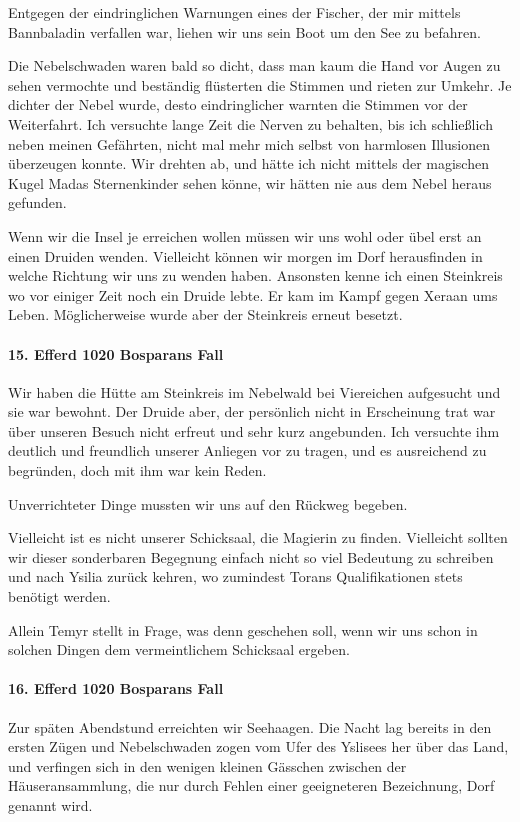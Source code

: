 Entgegen der eindringlichen Warnungen eines der Fischer, der mir mittels Bannbaladin verfallen war, liehen wir uns sein Boot um den See zu befahren.

Die Nebelschwaden waren bald so dicht, dass man kaum die Hand vor Augen zu sehen vermochte und beständig flüsterten die Stimmen und rieten zur Umkehr. Je dichter der Nebel wurde, desto eindringlicher warnten die Stimmen vor der Weiterfahrt. Ich versuchte lange Zeit die Nerven zu behalten, bis ich schließlich neben meinen Gefährten, nicht mal mehr mich selbst von harmlosen Illusionen überzeugen konnte. Wir drehten ab, und hätte ich nicht mittels der magischen Kugel Madas Sternenkinder sehen könne, wir hätten nie aus dem Nebel heraus gefunden.

Wenn wir die Insel je erreichen wollen müssen wir uns wohl oder übel erst an einen Druiden wenden. Vielleicht können wir morgen im Dorf herausfinden in welche Richtung wir uns zu wenden haben. Ansonsten kenne ich einen Steinkreis wo vor einiger Zeit noch ein Druide lebte. Er kam im Kampf gegen Xeraan ums Leben. Möglicherweise wurde aber der Steinkreis erneut besetzt.

\paragraph{15. Efferd 1020 Bosparans Fall}
Wir haben die Hütte am Steinkreis im Nebelwald bei Viereichen aufgesucht und sie war bewohnt. Der Druide aber, der persönlich nicht in Erscheinung trat war über unseren Besuch nicht erfreut und sehr kurz angebunden. Ich versuchte ihm deutlich und freundlich unserer Anliegen vor zu tragen, und es ausreichend zu begründen, doch mit ihm war kein Reden.

Unverrichteter Dinge mussten wir uns auf den Rückweg begeben.

Vielleicht ist es nicht unserer Schicksaal, die Magierin zu finden. Vielleicht sollten wir dieser sonderbaren Begegnung einfach nicht so viel Bedeutung zu schreiben und nach Ysilia zurück kehren, wo zumindest Torans Qualifikationen stets benötigt werden.

Allein Temyr stellt in Frage, was denn geschehen soll, wenn wir uns schon in solchen Dingen dem vermeintlichem Schicksaal ergeben.

\paragraph{16. Efferd 1020 Bosparans Fall}
Zur späten Abendstund erreichten wir Seehaagen. Die Nacht lag bereits in den ersten Zügen und Nebelschwaden zogen vom Ufer des Yslisees her über das Land, und verfingen sich in den wenigen kleinen Gässchen zwischen der Häuseransammlung, die nur durch Fehlen einer geeigneteren Bezeichnung, Dorf genannt wird.

